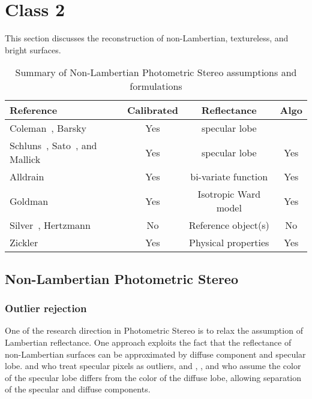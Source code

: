 \section{Class 2}
This section discusses the reconstruction of non-Lambertian, textureless, and bright surfaces. 

\begin{table}[h]
  \centering
  \begin{tabular}{l*{3}{c}}
  \hline
  \textbf{Reference} & Calibrated & Reflectance &Algo\\
  \hline
  Coleman~\cite{coleman1982obtaining}, Barsky~\cite{barsky20034} & Yes & specular lobe &\\
  Schluns~\cite{schluns1993photometric}, Sato~\cite{sato1994temporal}, and Mallick~\cite{mallick2005beyond} & Yes & specular lobe & Yes\\
  Alldrain~\cite{alldrin2008photometric} & Yes & bi-variate function & Yes\\
  Goldman~\cite{goldman2010shape} & Yes & Isotropic Ward model & Yes\\
  Silver~\cite{silver1980determining}, Hertzmann~\cite{hertzmann2005example} & No & Reference object(s) & No\\
  Zickler~\cite{zickler2002helmholtz} & Yes & Physical properties & Yes\\
  \hline
  \end{tabular}
  \caption{Summary of Non-Lambertian Photometric Stereo assumptions and formulations}
  \label{tab:class_2}
\end{table}

\subsection{Non-Lambertian Photometric Stereo}
\subsubsection{Outlier rejection}
One of the research direction in Photometric Stereo is to relax the assumption of Lambertian reflectance. One approach exploits the fact that the reflectance of non-Lambertian surfaces can be approximated by diffuse component and specular lobe. \citeauthor{coleman1982obtaining} and \citeauthor{barsky20034} who treat specular pixels as outliers, and \citeauthor{schluns1993photometric}, \citeauthor{sato1994temporal}, and \citeauthor{mallick2005beyond} who assume the color of the specular lobe differs from the color of the diffuse lobe, allowing separation of the specular and diffuse components.

